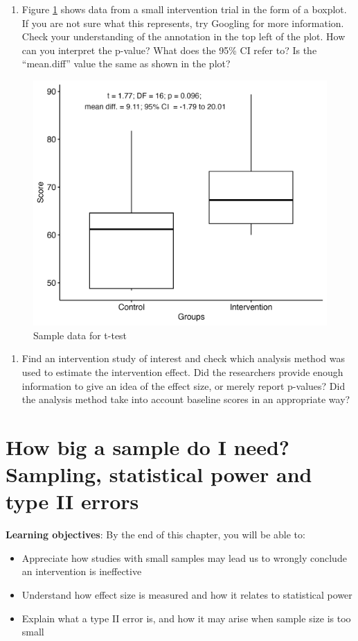 \documentclass{krantz}
\providecommand{\tightlist}{%
\setlength{\itemsep}{0pt}\setlength{\parskip}{0pt}}
\begin{document}
\begin{enumerate}
\def\labelenumi{\arabic{enumi}.}
\tightlist
\item
  Figure \ref{fig:boxploteg} shows data from a small intervention trial in the form of a boxplot. If you are not sure what this represents, try Googling for more information. Check your understanding of the annotation in the top left of the plot. How can you interpret the p-value? What does the 95\% CI refer to? Is the ``mean.diff'' value the same as shown in the plot?
\end{enumerate}

\begin{center}
\begin{figure}
\includegraphics[width=0.5\linewidth]{images_bw/boxeg} \caption{Sample data for t-test}\label{fig:boxploteg}
\end{figure}
\end{center}

\begin{enumerate}
\def\labelenumi{\arabic{enumi}.}
\setcounter{enumi}{1}
\tightlist
\item
  Find an intervention study of interest and check which analysis method was used to estimate the intervention effect. Did the researchers provide enough information to give an idea of the effect size, or merely report p-values? Did the analysis method take into account baseline scores in an appropriate way?
\end{enumerate}

\hypertarget{power}{%
\chapter{How big a sample do I need? Sampling, statistical power and type II errors}\label{power}}

\textbf{Learning objectives}: By the end of this chapter, you will be able to:

\begin{itemize}
\item
  Appreciate how studies with small samples may lead us to wrongly conclude an intervention is ineffective
\item
  Understand how effect size is measured and how it relates to statistical power
\item
  Explain what a type II error is, and how it may arise when sample size is too small
\end{itemize}
\end{document}
